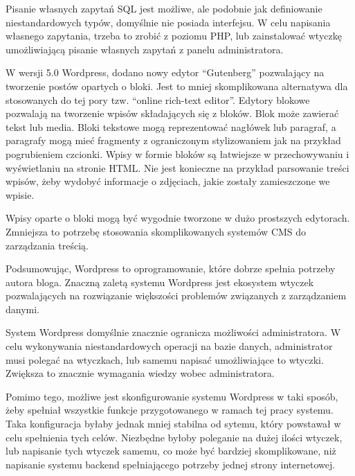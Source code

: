 \FloatBarrier


Pisanie własnych zapytań SQL jest możliwe, ale podobnie jak definiowanie
niestandardowych typów, domyślnie nie posiada interfejsu. W celu napisania
własnego zapytania, trzeba to zrobić z poziomu PHP, lub zainstalować wtyczkę
umożliwiającą pisanie własnych zapytań z panelu administratora.

W wersji 5.0 Wordpress, dodano nowy edytor ``Gutenberg'' pozwalający na
tworzenie postów opartych o bloki. Jest to mniej skomplikowana alternatywa dla
stosowanych do tej pory tzw. ``online rich-text editor''. Edytory blokowe
pozwalają na tworzenie wpisów składających się z bloków. Blok może zawierać
tekst lub media. Bloki tekstowe mogą reprezentować nagłówek lub paragraf, a
paragrafy mogą mieć fragmenty z ograniczonym stylizowaniem jak na przykład
pogrubieniem czcionki. Wpisy w formie bloków są łatwiejsze w przechowywaniu i
wyświetlaniu na stronie HTML. Nie jest konieczne na przykład parsowanie treści
wpisów, żeby wydobyć informacje o zdjęciach, jakie zostały zamieszczone we
wpisie.

Wpisy oparte o bloki mogą być wygodnie tworzone w dużo prostszych edytorach.
Zmniejsza to potrzebę stosowania skomplikowanych systemów CMS do zarządzania
treścią.

Podsumowując, Wordpress to oprogramowanie, które dobrze spełnia potrzeby autora
bloga. Znaczną zaletą systemu Wordpress jest ekosystem wtyczek pozwalających na
rozwiązanie większości problemów związanych z zarządzaniem danymi.

System Wordpress domyślnie znacznie ogranicza możliwości administratora. W celu
wykonywania niestandardowych operacji na bazie danych, administrator musi
polegać na wtyczkach, lub samemu napisać umożliwiające to wtyczki. Zwiększa to
znacznie wymagania wiedzy wobec administratora.

Pomimo tego, możliwe jest skonfigurowanie systemu Wordpress w taki sposób, żeby
spełniał wszystkie funkcje przygotowanego w ramach tej pracy systemu. Taka
konfiguracja byłaby jednak mniej stabilna od sytemu, który powstawał w celu
spełnienia tych celów. Niezbędne byłoby poleganie na dużej ilości wtyczek, lub
napisanie tych wtyczek samemu, co może być bardziej skomplikowane, niż napisanie
systemu backend spełniającego potrzeby jednej strony internetowej.

